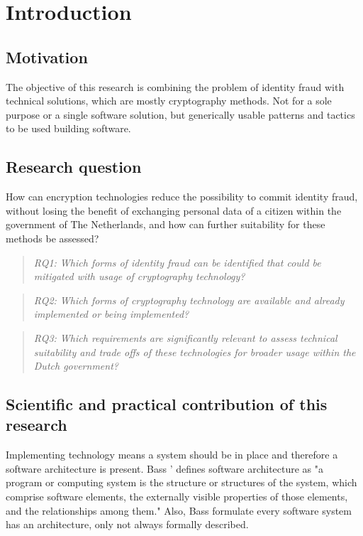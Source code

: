 \chapter{Introduction}\label{s:intro}


\section{Motivation}
The objective of this research is combining the problem of identity fraud with technical solutions, which are mostly cryptography methods. Not for a sole purpose or a single software solution, but generically usable patterns and tactics to be used building software.

\section{Research question}
How can encryption technologies reduce the possibility to commit identity fraud, without losing the benefit of exchanging personal data of a citizen within the government of The Netherlands, and how can further suitability for these methods be assessed?

\begin{quote}\emph{RQ1: Which forms of identity fraud can be identified that could be mitigated with usage of cryptography technology?}\end{quote}
\begin{quote}\emph{RQ2: Which forms of cryptography technology are available and already implemented or being implemented?}\end{quote}
\begin{quote}\emph{RQ3: Which requirements are significantly relevant to assess technical suitability and trade offs of these technologies for broader usage within the Dutch government?}\end{quote}

\section{Scientific and practical contribution of this research}
Implementing technology means a system should be in place and therefore a software architecture is present. Bass '\etal \cite{Bass2015SoftwareAI} defines software architecture as "a program or computing system is the structure or structures of the system, which comprise software elements, the externally visible properties of those elements, and the relationships among them." Also, Bass \etal formulate every software system has an architecture, only not always formally described.

